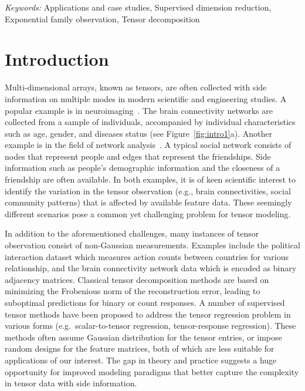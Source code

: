 \documentclass[12pt]{article}
\theoremstyle{plain}
\theoremstyle{definition}
\begin{document}
\noindent%
{\it Keywords:} Applications and case studies, Supervised dimension reduction, Exponential family observation, Tensor decomposition
\vfill

\newpage
{} %
\section{Introduction}
\label{sec:intro}


Multi-dimensional arrays, known as tensors, are often collected with side information on multiple modes in modern scientific and engineering studies. A popular example is in neuroimaging~\citep{sun2017store,zhou2013tensor}. The brain connectivity networks are collected from a sample of individuals, accompanied by individual characteristics such as age, gender, and diseases status (see Figure~\ref{fig:intro1}a). Another example is in the field of network analysis~\citep{baldin2018optimal,hoff2005bilinear}. A typical social network consists of nodes that represent people and edges that represent the friendships. Side information such as people’s demographic information and the closeness of a friendship are often available. In both examples, it is of keen scientific interest to identify the variation in the tensor observation (e.g., brain connectivities, social community patterns) that is affected by available feature data. These seemingly different scenarios pose a common yet challenging problem for tensor modeling. 

In addition to the aforementioned challenges, many instances of tensor observation consist of non-Gaussian measurements. Examples include the political interaction dataset \citep{hu2015scalable} which measures action counts between countries for various relationship, and the brain connectivity network data \citep{wang2019common} which is encoded as binary adjacency matrices. Classical tensor decomposition methods are based on minimizing the Frobenious norm of the reconstruction error, leading to suboptimal predictions for binary or count responses. A number of supervised tensor methods have been proposed \citep{yu2016learning, raskutti2015convex, zhao2012higher} to address the tensor regression problem in various forms (e.g.\ scalar-to-tensor regression, tensor-response regression). These methods often assume Gaussian distribution for the tensor entries, or impose random designs for the feature matrices, both of which are less suitable for applications of our interest. The gap in theory and practice suggests a huge opportunity for improved modeling paradigms that better capture the complexity in tensor data with side information.
\end{document}
